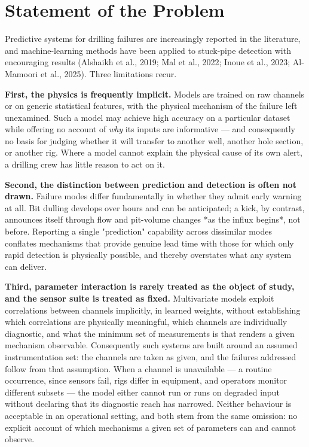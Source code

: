 \documentclass[12pt,a4paper]{report}
\begin{document}
\section{Statement of the Problem}

Predictive systems for drilling failures are increasingly reported in the literature, and machine-learning
methods have been applied to stuck-pipe detection with encouraging results (Alshaikh et al., 2019; Mal et
al., 2022; Inoue et al., 2023; Al-Mamoori et al., 2025). Three limitations recur.

\textbf{First, the physics is frequently implicit.} Models are trained on raw channels or on generic
statistical features, with the physical mechanism of the failure left unexamined. Such a model may achieve
high accuracy on a particular dataset while offering no account of \emph{why} its inputs are informative --- and
consequently no basis for judging whether it will transfer to another well, another hole section, or
another rig. Where a model cannot explain the physical cause of its own alert, a drilling crew has little
reason to act on it.

\textbf{Second, the distinction between prediction and detection is often not drawn.} Failure modes differ
fundamentally in whether they admit early warning at all. Bit dulling develops over hours and can be
anticipated; a kick, by contrast, announces itself through flow and pit-volume changes *as the influx
begins*, not before. Reporting a single "prediction" capability across dissimilar modes conflates
mechanisms that provide genuine lead time with those for which only rapid detection is physically
possible, and thereby overstates what any system can deliver.

\textbf{Third, parameter interaction is rarely treated as the object of study, and the sensor suite is treated as
fixed.} Multivariate models exploit correlations between channels implicitly, in learned weights, without
establishing which correlations are physically meaningful, which channels are individually diagnostic, and
what the minimum set of measurements is that renders a given mechanism observable. Consequently such
systems are built around an assumed instrumentation set: the channels are taken as given, and the failures
addressed follow from that assumption. When a channel is unavailable --- a routine occurrence, since sensors
fail, rigs differ in equipment, and operators monitor different subsets --- the model either cannot run or
runs on degraded input without declaring that its diagnostic reach has narrowed. Neither behaviour is
acceptable in an operational setting, and both stem from the same omission: no explicit account of which
mechanisms a given set of parameters can and cannot observe.
\end{document}
